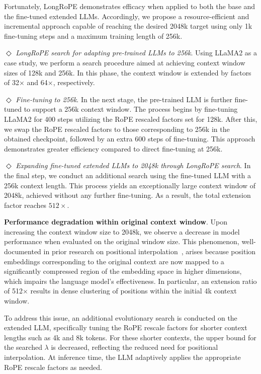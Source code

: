 Fortunately, LongRoPE demonstrates efficacy when applied to both the base and the fine-tuned extended LLMs. Accordingly, we propose a resource-efficient and incremental approach capable of reaching the desired 2048k target using only 1k fine-tuning steps and a maximum training length of 256k.

$\Diamond$ \textit{LongRoPE search for adapting pre-trained LLMs to 256k}. Using LLaMA2 as a case study, we perform a search procedure aimed at achieving context window sizes of 128k and 256k. In this phase, the context window is extended by factors of 32$\times$ and 64$\times$, respectively.

$\Diamond$ \textit{Fine-tuning to 256k}. In the next stage, the pre-trained LLM is further fine-tuned to support a 256k context window. The process begins by fine-tuning LLaMA2 for 400 steps utilizing the RoPE rescaled factors set for 128k. After this, we swap the RoPE rescaled factors to those corresponding to 256k in the obtained checkpoint, followed by an extra 600 steps of fine-tuning. This approach demonstrates greater efficiency compared to direct fine-tuning at 256k.

$\Diamond$ \textit{Expanding fine-tuned extended LLMs to 2048k through LongRoPE search}. In the final step, we conduct an additional search using the fine-tuned LLM with a 256k context length. This process yields an exceptionally large context window of 2048k, achieved without any further fine-tuning. As a result, the total extension factor reaches $512\times$.

\textbf{Performance degradation within original context window}. Upon increasing the context window size to 2048k, we observe a decrease in model performance when evaluated on the original window size. This phenomenon, well-documented in prior research on positional interpolation~\cite{pi}, arises because position embeddings corresponding to the original context are now mapped to a significantly compressed region of the embedding space in higher dimensions, which impairs the language model’s effectiveness. In particular, an extension ratio of 512$\times$ results in dense clustering of positions within the initial 4k context window.

To address this issue, an additional evolutionary search is conducted on the extended LLM, specifically tuning the RoPE rescale factors for shorter context lengths such as 4k and 8k tokens. For these shorter contexts, the upper bound for the searched $\lambda$ is decreased, reflecting the reduced need for positional interpolation. At inference time, the LLM adaptively applies the appropriate RoPE rescale factors as needed.

